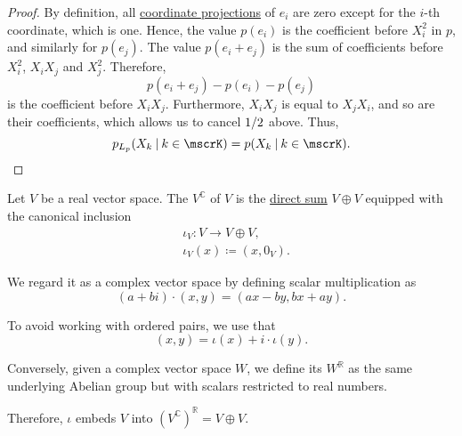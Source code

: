 \begin{proof}
  By definition, all \hyperref[def:basis_decomposition]{coordinate projections} of \( e_i \) are zero except for the \( i \)-th coordinate, which is one. Hence, the value \( p(e_i) \) is the coefficient before \( X_i^2 \) in \( p \), and similarly for \( p(e_j) \). The value \( p(e_i + e_j) \) is the sum of coefficients before \( X_i^2 \), \( X_i X_j \) and \( X_j^2 \). Therefore,
  \begin{equation*}
    p(e_i + e_j) - p(e_i) - p(e_j)
  \end{equation*}
  is the coefficient before \( X_i X_j \). Furthermore, \( X_i X_j \) is equal to \( X_j X_i \), and so are their coefficients, which allows us to cancel \( \ifrac 1 2 \) above. Thus,
  \begin{equation*}
    p_{L_p}(X_k \given k \in \mscrK) = p(X_k \given k \in \mscrK).
  \end{equation*}
\end{proof}

\begin{definition}\label{def:complexification}
  Let \( V \) be a real vector space. The  \( V^\BbbC \) of \( V \) is the \hyperref[def:semimodule_direct_product]{direct sum} \( V \oplus V \) equipped with the canonical inclusion
  \begin{equation*}
    \begin{aligned}
      &\iota_V: V \to V \oplus V, \\
      &\iota_V(x) \coloneqq (x, 0_V).
    \end{aligned}
  \end{equation*}

  We regard it as a complex vector space by defining scalar multiplication as
  \begin{equation*}
    (a + bi) \cdot (x, y) = (ax - by, bx + ay).
  \end{equation*}

  To avoid working with ordered pairs, we use that
  \begin{equation*}
    (x, y) = \iota(x) + i \cdot \iota(y).
  \end{equation*}

  Conversely, given a complex vector space \( W \), we define its  \( W^\BbbR \) as the same underlying Abelian group but with scalars restricted to real numbers.

  Therefore, \( \iota \) embeds \( V \) into \( (V^\BbbC)^\BbbR = V \oplus V \).
\end{definition}

